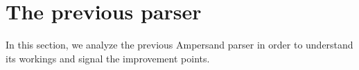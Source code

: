 
\section{The previous parser}
\label{sec:analysis}
In this section, we analyze the previous Ampersand parser in order to understand its workings and signal the improvement points.






